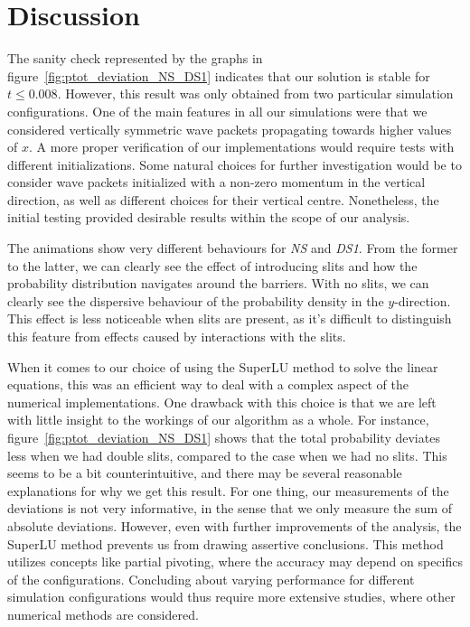 \section{Discussion}\label{sec:discussion}

The sanity check represented by the graphs in figure~\ref{fig:ptot_deviation_NS_DS1} indicates that our solution is stable for $t\leq 0.008$. However, this result was only obtained from two particular simulation configurations. One of the main features in all our simulations were that we considered vertically symmetric wave packets propagating towards higher values of $x$. A more proper verification of our implementations would require tests with different initializations. Some natural choices for further investigation would be to consider wave packets initialized with a non-zero momentum in the vertical direction, as well as different choices for their vertical centre. Nonetheless, the initial testing provided desirable results within the scope of our analysis. 

The animations show very different behaviours for \textit{NS} and \textit{DS1}. From the former to the latter, we can clearly see the effect of introducing slits and how the probability distribution navigates around the barriers. With no slits, we can clearly see the dispersive behaviour of the probability density in the $y$-direction. This effect is less noticeable when slits are present, as it's difficult to distinguish this feature from effects caused by interactions with the slits. 

When it comes to our choice of using the SuperLU method to solve the linear equations, this was an efficient way to deal with a complex aspect of the numerical implementations. One drawback with this choice is that we are left with little insight to the workings of our algorithm as a whole. For instance, figure~\ref{fig:ptot_deviation_NS_DS1} shows that the total probability deviates less when we had double slits, compared to the case when we had no slits. This seems to be a bit counterintuitive, and there may be several reasonable explanations for why we get this result. For one thing, our measurements of the deviations is not very informative, in the sense that we only measure the sum of absolute deviations. However, even with further improvements of the analysis, the SuperLU method prevents us from drawing assertive conclusions. This method utilizes concepts like partial pivoting, where the accuracy may depend on specifics of the configurations. Concluding about varying performance for different simulation configurations would thus require more extensive studies, where other numerical methods are considered.        






